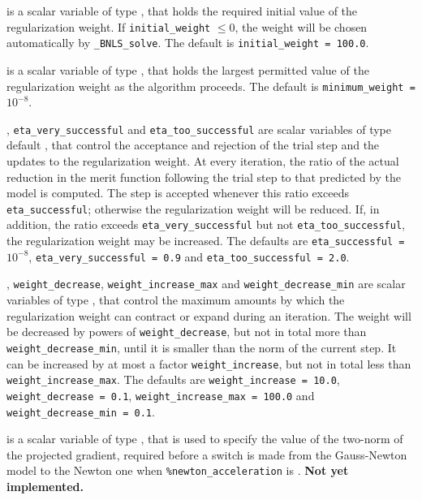 \documentclass{galahad}
\newcommand{\packagename}{BNLS}
\newcommand{\fullpackagename}{\libraryname\_\packagename}
\newcommand{\solver}{{\tt \fullpackagename\_solve}}
\begin{document}
\begin{description}
 is a scalar variable of type \realdp, that holds
the required initial value of the regularization weight. If
{\tt initial\_weight} $\leq 0$, the weight will be chosen automatically
by \solver.
The default is {\tt initial\_weight = 100.0}.

 is a scalar variable of type \realdp, that holds
the largest permitted value of the regularization weight as the algorithm
proceeds.
The default is {\tt minimum\_weight =} $10^{-8}$.

, {\tt eta\_very\_successful}
and {\tt eta\_too\_successful}
are scalar variables of type default
\realdp, that control the acceptance and rejection of the trial step
and the updates to the regularization weight.
At every iteration, the ratio of the actual reduction in the merit function
following the trial step to that predicted by the model is computed.
The step is accepted whenever this ratio exceeds {\tt eta\_successful};
otherwise the regularization weight will be reduced.
If, in addition, the ratio exceeds {\tt eta\_very\_successful} but not
{\tt eta\_too\_successful}, the regularization weight may be increased.
The defaults are
{\tt eta\_successful =} $10^{-8}$,
{\tt eta\_very\_successful = 0.9} and
{\tt eta\_too\_successful = 2.0}.

,
{\tt weight\_decrease},
{\tt weight\_increase\_max}
and
{\tt weight\_decrease\_min}
are scalar variables of type \realdp, that
control the maximum amounts by which the regularization weight can
contract or expand during an iteration. The weight will be decreased by
powers of {\tt weight\_decrease}, but not in total
more than  {\tt weight\_decrease\_min}, until it is smaller than the norm of
the current step.
It can be increased by at most a factor {\tt weight\_increase}, but not
in total less than {\tt weight\_increase\_max}.
The defaults are
{\tt weight\_increase = 10.0},
{\tt weight\_decrease = 0.1},
{\tt weight\_incr\-ease\_max = 100.0} and
{\tt weight\_decrease\_min = 0.1}.

 is a scalar variable of type \realdp,
that is used to specify the value of the two-norm of the projected gradient,
required before a switch is made from the Gauss-Newton model to the Newton 
one when {\tt \%newton\_acceleration} is \true.
{\bf Not yet implemented.}


\end{description}
\end{document}

